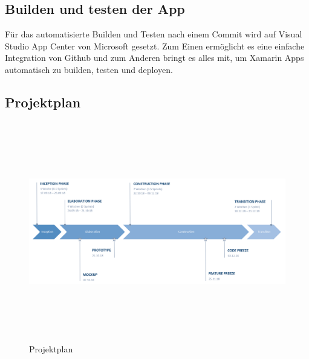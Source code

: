 \subsection{Builden und testen der App}
Für das automatisierte Builden und Testen nach einem Commit wird auf Visual Studio App Center von Microsoft gesetzt. Zum Einen ermöglicht es eine einfache Integration von Github und zum Anderen bringt es alles mit, um Xamarin Apps automatisch zu builden, testen und deployen. 


\begin{landscape}
	\thispagestyle{empty}
	\subsection{Projektplan}
		\begin{figure}[h]
			\centering
			\includegraphics[width=1\linewidth, height=9.6cm]{img/projekt-plan/projekt-plan}
			\caption[Projektplan]{Projektplan}
			\label{fig:projekt-plan}
		\end{figure}
\end{landscape}